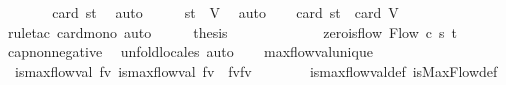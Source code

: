 \begin{isabellebody}
%
\isadelimproof
%
\endisadelimproof
%
\isatagproof
{}\isamarkupfalse%
\ {\isacharminus}\isanewline
\ \ \isamarkupfalse%
\ {\isachardoublequoteopen}{}\ {\isacharequal}\ card\ {\isacharbraceleft}s{\isacharcomma}t{\isacharbraceright}{\isachardoublequoteclose}\ \isamarkupfalse%
\ auto\isanewline
\ \ \isamarkupfalse%
\ \isamarkupfalse%
\ {\isachardoublequoteopen}{\isacharbraceleft}s{\isacharcomma}t{\isacharbraceright}\ {\isasymsubseteq}\ V{\isachardoublequoteclose}\ \isamarkupfalse%
\ auto\isanewline
\ \ \isamarkupfalse%
\ {\isachardoublequoteopen}card\ {\isacharbraceleft}s{\isacharcomma}t{\isacharbraceright}\ {\isasymle}\ card\ V{\isachardoublequoteclose}\ \isamarkupfalse%
\ {\isacharparenleft}rule{\isacharunderscore}tac\ card{\isacharunderscore}mono{\isacharparenright}\ auto\isanewline
\ \ \isamarkupfalse%
\ \isamarkupfalse%
\ {\isacharquery}thesis\ \isacommand{{\isachardot}}\isamarkupfalse%
\ \ \ \isanewline
{}\isamarkupfalse%
%
\endisatagproof
{\isafoldproof}%
%
\isadelimproof
\ \ \isanewline
%
\endisadelimproof
\ \ \ \ \isanewline
{}\isamarkupfalse%
\ zero{\isacharunderscore}is{\isacharunderscore}flow{\isacharcolon}\ {\isachardoublequoteopen}Flow\ c\ s\ t\ {\isacharparenleft}{\isasymlambda}{\isacharunderscore}{\isachardot}\ {}{\isacharparenright}{\isachardoublequoteclose}\isanewline
%
\isadelimproof
\ \ %
\endisadelimproof
%
\isatagproof
{}\isamarkupfalse%
\ cap{\isacharunderscore}non{\isacharunderscore}negative\ \isamarkupfalse%
\ unfold{\isacharunderscore}locales\ auto%
\endisatagproof
{\isafoldproof}%
%
\isadelimproof
\ \ \isanewline
%
\endisadelimproof
\isanewline
{}\isamarkupfalse%
\ max{\isacharunderscore}flow{\isacharunderscore}val{\isacharunderscore}unique{\isacharcolon}\ \isanewline
\ \ {\isachardoublequoteopen}{\isasymlbrakk}is{\isacharunderscore}max{\isacharunderscore}flow{\isacharunderscore}val\ fv{}{\isacharsemicolon}\ is{\isacharunderscore}max{\isacharunderscore}flow{\isacharunderscore}val\ fv{}{\isasymrbrakk}\ {\isasymLongrightarrow}\ fv{}{\isacharequal}fv{}{\isachardoublequoteclose}\ \ \ \ \isanewline
%
\isadelimproof
\ \ %
\endisadelimproof
%
\isatagproof
{}\isamarkupfalse%
\ is{\isacharunderscore}max{\isacharunderscore}flow{\isacharunderscore}val{\isacharunderscore}def\ isMaxFlow{\isacharunderscore}def\ \isanewline

\end{isabellebody}

